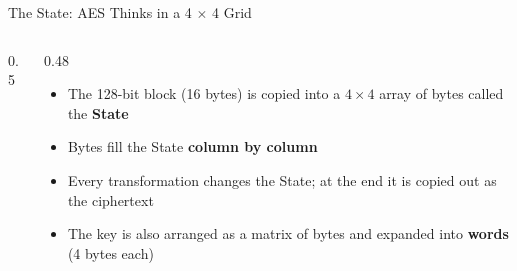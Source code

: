 \documentclass[aspectratio=169,11pt,xcolor={table}]{beamer}
\begin{document}
\begin{frame}{The State: AES Thinks in a 4 $\times$ 4 Grid}
  \begin{columns}[c]
    \begin{column}{0.5\textwidth}
      \centering
    \end{column}
    \begin{column}{0.48\textwidth}
      \begin{itemize}\small\setlength{\itemsep}{4pt}
        \item The 128-bit block (16 bytes) is copied into a $4 \times 4$ array of bytes called the \textbf{State}
        \item Bytes fill the State \textbf{column by column}
        \item Every transformation changes the State; at the end it is copied out as the ciphertext
        \item The key is also arranged as a matrix of bytes and expanded into \textbf{words} (4 bytes each)
      \end{itemize}
    \end{column}
  \end{columns}
\end{frame}
\end{document}
